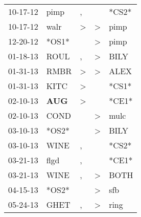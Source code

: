 \begin{supertabular}{p{0.07\textwidth}p{0.06\textwidth}p{0.02\textwidth}p{0.02\textwidth}p{0.06\textwidth}}
          10-17-12\textsuperscript{} &           pimp\textsuperscript{} &                , &                  &                            *CS2* \\
          10-17-12\textsuperscript{} &           walr\textsuperscript{} &     \textgreater &     \textgreater &           pimp\textsuperscript{} \\
          12-20-12\textsuperscript{} &                            *OS1* &                  &     \textgreater &           pimp\textsuperscript{} \\
          01-18-13\textsuperscript{} &           ROUL\textsuperscript{} &                , &     \textgreater &           BILY\textsuperscript{} \\
          01-31-13\textsuperscript{} &           RMBR\textsuperscript{} &     \textgreater &     \textgreater &           ALEX\textsuperscript{} \\
          01-31-13\textsuperscript{} &           KITC\textsuperscript{} &     \textgreater &                  &                            *CS1* \\
          02-10-13\textsuperscript{} &   \textbf{AUG\textsuperscript{}} &     \textgreater &                  &                            *CE1* \\
          02-10-13\textsuperscript{} &           COND\textsuperscript{} &                  &     \textgreater &           mulc\textsuperscript{} \\
          03-10-13\textsuperscript{} &                            *OS2* &                  &     \textgreater &           BILY\textsuperscript{} \\
          03-10-13\textsuperscript{} &           WINE\textsuperscript{} &                , &                  &                            *CS2* \\
          03-21-13\textsuperscript{} &           flgd\textsuperscript{} &                , &                  &                            *CE1* \\
          03-21-13\textsuperscript{} &           WINE\textsuperscript{} &                , &     \textgreater &           BOTH\textsuperscript{} \\
          04-15-13\textsuperscript{} &                            *OS2* &                  &     \textgreater &            sfb\textsuperscript{} \\
          05-24-13\textsuperscript{} &           GHET\textsuperscript{} &                , &     \textgreater &           ring\textsuperscript{} \\

\end{supertabular}
